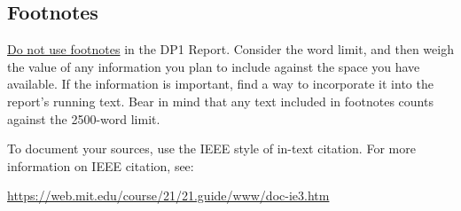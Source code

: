 \documentclass[strict]{6033dp1}
\begin{document}
\subsection{Footnotes}
\uline{Do not use footnotes} in the DP1 Report.  Consider the word
limit, and then weigh the value of any information you plan to include
against the space you have available.  If the information is
important, find a way to incorporate it into the report's running
text.  Bear in mind that any text included in footnotes counts against
the 2500-word limit.

To document your sources, use the IEEE style of in-text citation.  For
more information on IEEE citation, see:

\url{https://web.mit.edu/course/21/21.guide/www/doc-ie3.htm}
\end{document}
